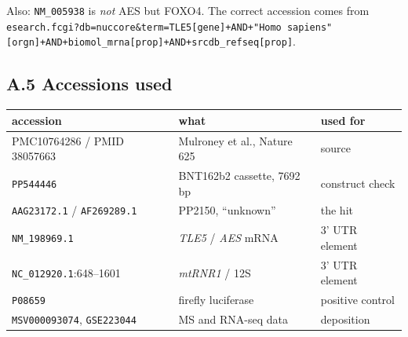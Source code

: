 \documentclass[11pt,a4paper]{article}
\begin{document}
Also: \texttt{NM\_005938} is \emph{not} AES but FOXO4. The correct accession
comes from \texttt{esearch.fcgi?db=nuccore\&term=TLE5[gene]+AND+"Homo
sapiens"[orgn]+AND+biomol\_mrna[prop]+AND+srcdb\_refseq[prop]}.

\subsection*{A.5 Accessions used}

\begin{center}
\footnotesize
\begin{tabular}{lll}
\toprule
accession & what & used for \\
\midrule
PMC10764286 / PMID 38057663 & Mulroney et al., Nature 625 & source \\
\texttt{PP544446} & BNT162b2 cassette, 7692\,bp & construct check \\
\texttt{AAG23172.1} / \texttt{AF269289.1} & PP2150, ``unknown'' & the hit \\
\texttt{NM\_198969.1} & \emph{TLE5} / \emph{AES} mRNA & 3' UTR element \\
\texttt{NC\_012920.1}:648--1601 & \emph{mtRNR1} / 12S & 3' UTR element \\
\texttt{P08659} & firefly luciferase & positive control \\
\texttt{MSV000093074}, \texttt{GSE223044} & MS and RNA-seq data & deposition \\
\bottomrule
\end{tabular}
\end{center}
\end{document}

